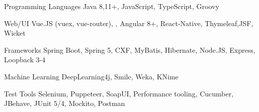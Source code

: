

\begin{cvskills}


  \cvskill
  {Programming Languages} %
  {Java 8,11+, JavaScript, TypeScript, Groovy} %

    
  \cvskill
  {Web/UI} %
  {Vue.JS (vuex, vue-router), , Angular 8+, React-Native, Thymeleaf,JSF, Wicket} %

  \cvskill
  {Frameworks} %
  {Spring Boot, Spring 5, CXF, MyBatis, Hibernate, Node.JS, Express, Loopback 3-4} %

  \cvskill
  {Machine Learning} %
  {DeepLearning4j, Smile, Weka, KNime} %


  \cvskill
  {Test Tools} %
  {Selenium, Puppeteer, SoapUI, Performance tooling, Cucumber, JBehave, JUnit 5/4, Mockito, Postman} %

\end{cvskills}




